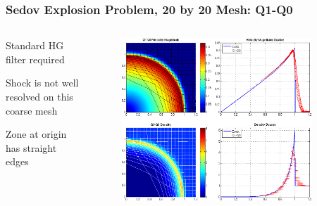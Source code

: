 \documentclass[8pt,xcolor=svgnames]{beamer}
\begin{document}
\begin{frame}
 \frametitle{Sedov Explosion Problem, 20 by 20 Mesh: Q1-Q0}
 \begin{columns}[T]
  \begin{column}{0.24\textwidth}
  \bigskip
   \begin{itemize}
   \small{
    \item Standard HG filter required
    \item Shock is not well resolved on this coarse mesh
    \item Zone at origin has straight edges}
   \end{itemize}
  \end{column}
  \begin{column}{0.8\textwidth}
   \begin{figure}[h!]
    \centering
    \includegraphics[width=0.9\textwidth,keepaspectratio=true]{./Images/NewSedov_Q1Q0.png}
    \end{figure}
  \end{column}
 \end{columns}
\end{frame}
\end{document}
